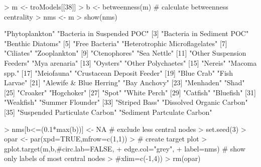 \documentclass[11pt]{article}
\begin{document}
\begin{Schunk}
\begin{Sinput}
> m <- troModels[[38]]
> b <- betweenness(m)         # calculate betweenness centrality
> nms <- m%
> show(nms)
\end{Sinput}
\begin{Soutput}
 [1] "Phytoplankton"                 "Bacteria in Suspended POC"    
 [3] "Bacteria in Sediment POC"      "Benthic Diatoms"              
 [5] "Free Bacteria"                 "Heterotrophic Microflagelates"
 [7] "Ciliates"                      "Zooplankton"                  
 [9] "Ctenophores"                   "Sea Nettle"                   
[11] "Other Suspension Feeders"      "Mya arenaria"                 
[13] "Oysters"                       "Other Polychaetes"            
[15] "Nereis"                        "Macoma spp."                  
[17] "Meiofauna"                     "Crustacean Deposit Feeder"    
[19] "Blue Crab"                     "Fish Larvae"                  
[21] "Alewife & Blue Herring"        "Bay Anchovy"                  
[23] "Menhaden"                      "Shad"                         
[25] "Croaker"                       "Hogchoker"                    
[27] "Spot"                          "White Perch"                  
[29] "Catfish"                       "Bluefish"                     
[31] "Weakfish"                      "Summer Flounder"              
[33] "Striped Bass"                  "Dissolved Organic Carbon"     
[35] "Suspended Particulate Carbon"  "Sediment Partculate Carbon"   
\end{Soutput}
\begin{Sinput}
> nms[b<=(0.1*max(b))] <- NA  # exclude less central nodes
> set.seed(3)
> opar <- par(xpd=TRUE,mfrow=c(1,1))
> # create target plot
> gplot.target(m,b,#circ.lab=FALSE,
+               edge.col="grey",
+               label=nms) # show only labels of most central nodes
>              #xlim=c(-1,4))
> rm(opar)
\end{Sinput}
\end{Schunk}
\end{document}
